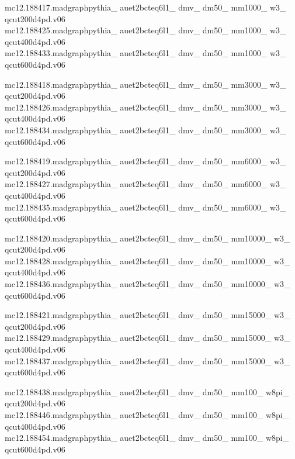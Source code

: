 mc12.188417.madgraphpythia\_ auet2bcteq6l1\_ dmv\_ dm50\_ mm1000\_ w3\_ \\ qcut200d4pd.v06\\
mc12.188425.madgraphpythia\_ auet2bcteq6l1\_ dmv\_ dm50\_ mm1000\_ w3\_ \\ qcut400d4pd.v06\\
mc12.188433.madgraphpythia\_ auet2bcteq6l1\_ dmv\_ dm50\_ mm1000\_ w3\_ \\ qcut600d4pd.v06

mc12.188418.madgraphpythia\_ auet2bcteq6l1\_ dmv\_ dm50\_ mm3000\_ w3\_ \\ qcut200d4pd.v06\\
mc12.188426.madgraphpythia\_ auet2bcteq6l1\_ dmv\_ dm50\_ mm3000\_ w3\_ \\ qcut400d4pd.v06\\
mc12.188434.madgraphpythia\_ auet2bcteq6l1\_ dmv\_ dm50\_ mm3000\_ w3\_ \\ qcut600d4pd.v06

mc12.188419.madgraphpythia\_ auet2bcteq6l1\_ dmv\_ dm50\_ mm6000\_ w3\_ \\ qcut200d4pd.v06\\
mc12.188427.madgraphpythia\_ auet2bcteq6l1\_ dmv\_ dm50\_ mm6000\_ w3\_ \\ qcut400d4pd.v06\\
mc12.188435.madgraphpythia\_ auet2bcteq6l1\_ dmv\_ dm50\_ mm6000\_ w3\_ \\ qcut600d4pd.v06

mc12.188420.madgraphpythia\_ auet2bcteq6l1\_ dmv\_ dm50\_ mm10000\_ w3\_ \\ qcut200d4pd.v06\\
mc12.188428.madgraphpythia\_ auet2bcteq6l1\_ dmv\_ dm50\_ mm10000\_ w3\_ \\ qcut400d4pd.v06\\
mc12.188436.madgraphpythia\_ auet2bcteq6l1\_ dmv\_ dm50\_ mm10000\_ w3\_ \\ qcut600d4pd.v06

mc12.188421.madgraphpythia\_ auet2bcteq6l1\_ dmv\_ dm50\_ mm15000\_ w3\_ \\ qcut200d4pd.v06\\
mc12.188429.madgraphpythia\_ auet2bcteq6l1\_ dmv\_ dm50\_ mm15000\_ w3\_ \\ qcut400d4pd.v06\\
mc12.188437.madgraphpythia\_ auet2bcteq6l1\_ dmv\_ dm50\_ mm15000\_ w3\_ \\ qcut600d4pd.v06

mc12.188438.madgraphpythia\_ auet2bcteq6l1\_ dmv\_ dm50\_ mm100\_ w8pi\_ \\ qcut200d4pd.v06\\
mc12.188446.madgraphpythia\_ auet2bcteq6l1\_ dmv\_ dm50\_ mm100\_ w8pi\_ \\ qcut400d4pd.v06\\
mc12.188454.madgraphpythia\_ auet2bcteq6l1\_ dmv\_ dm50\_ mm100\_ w8pi\_ \\ qcut600d4pd.v06

